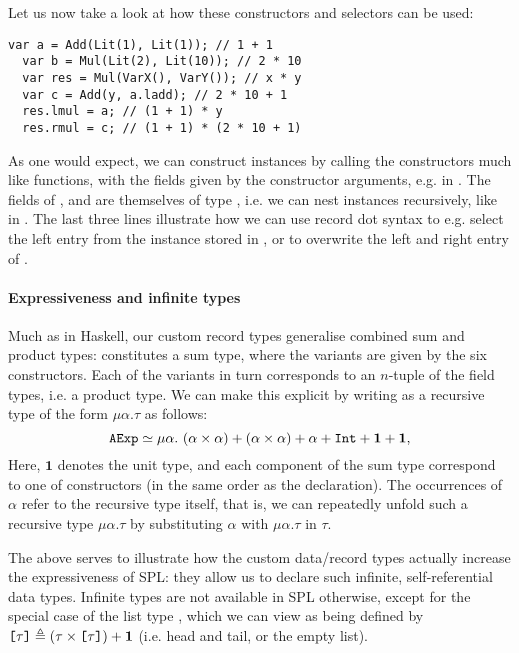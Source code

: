 Let us now take a look at how these constructors and selectors can be used:
\begin{lstlisting}[language=SPL]
  var a = Add(Lit(1), Lit(1)); // 1 + 1
  var b = Mul(Lit(2), Lit(10)); // 2 * 10
  var res = Mul(VarX(), VarY()); // x * y
  var c = Add(y, a.ladd); // 2 * 10 + 1
  res.lmul = a; // (1 + 1) * y
  res.rmul = c; // (1 + 1) * (2 * 10 + 1)
\end{lstlisting}
%
As one would expect, we can construct instances  by calling the
constructors much like functions, with the fields given by the constructor
arguments, e.g.  in . The fields of ,  and
 are themselves of type , i.e. we can nest 
instances recursively, like in .
The last three lines illustrate how we can use record dot syntax to e.g. select
the left entry from the  instance stored in , or to overwrite
the left and right entry of .

\paragraph{Expressiveness and infinite types}
Much as in Haskell, our custom record types generalise combined sum and product
types:  constitutes a sum type, where the variants are given by the
six constructors. Each of the variants in turn corresponds to an $n$-tuple of
the field types, i.e. a product type. We can make this explicit by writing
 as a recursive type of the form $\mu \alpha. \tau$ as follows:
\[ \texttt{AExp} \simeq \mu \alpha.\
    (\alpha \times \alpha) + (\alpha \times \alpha) + \alpha + \texttt{Int} + \mathbf{1} + \mathbf{1} ,\]
%
Here, $\mathbf{1}$ denotes the unit type, and each component of the sum type
correspond to one of constructors (in the same order as the declaration).
The occurrences of $\alpha$ refer to the recursive type itself, that is, we can
repeatedly unfold such a recursive type $\mu\alpha.\tau$ by substituting
$\alpha$ with $\mu\alpha.\tau$ in $\tau$.

The above serves to illustrate how the custom data/record types actually
increase the expressiveness of SPL: they allow us to declare such infinite,
self-referential data types. Infinite types are not available in SPL otherwise,
except for the special case of the list type \spl{[$\tau$]}, which we can view
as being defined by
$\texttt{[$\tau$]} \triangleq (\tau \times \texttt{[$\tau$]}) + \mathbf{1}$
(i.e. head and tail, or the empty list).

